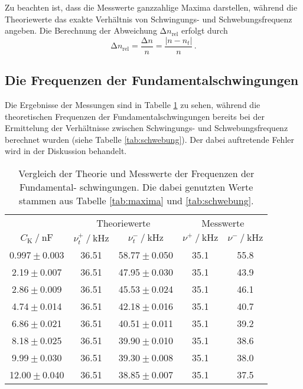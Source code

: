 Zu beachten ist, dass die Messwerte
ganzzahlige Maxima darstellen, während die Theoriewerte das exakte Verhältnis von
Schwingungs- und Schwebungsfrequenz angeben. Die Berechnung der Abweichung $\increment n_{\text{rel}}$ erfolgt durch
\begin{equation}
    \increment n_{\text{rel}} = \frac{\increment n}{n}=\frac{\left|n-n_{t}\right|}{n} \, .
\end{equation}


\subsection{Die Frequenzen der Fundamentalschwingungen}

Die Ergebnisse der Messungen sind in Tabelle \ref{tab:vergleich} zu sehen, während die
theoretischen Frequenzen der Fundamentalschwingungen bereits bei der
Ermittelung der Verhältnisse zwischen Schwingungs- und Schwebungsfrequenz berechnet
wurden (siehe Tabelle \ref{tab:schwebung}). Der dabei auftretende Fehler wird in der Diskussion behandelt.
\begin{table}
    \centering
    \caption{   Vergleich der Theorie und Messwerte der Frequenzen der Fundamental-
                schwingungen. Die dabei genutzten Werte stammen aus Tabelle
                \ref{tab:maxima} und \ref{tab:schwebung}.}
    \label{tab:vergleich}
    \begin{tabular}{c c c c c}
    \toprule
    & \multicolumn{2}{c}{Theoriewerte} & \multicolumn{2}{c}{Messwerte} \\
    \cmidrule(lr){2-3}\cmidrule(lr){4-5}
    {${C_\text{K}} \mathbin{/} \unit{\nano\farad}$} &
    {$\nu^+_{t} \mathbin{/} \unit{\kilo\hertz}$} & {$\nu^-_{t} \mathbin{/} \unit{\kilo\hertz}$} &
    {$\nu^+ \mathbin{/} \unit{\kilo\hertz}$} & {$\nu^- \mathbin{/} \unit{\kilo\hertz}$} \\
    \midrule
    0.997${}\pm{}$0.003 &    36.51 & 58.77${}\pm{}$0.050 &    35.1 &   55.8 \\
     2.19${}\pm{}$0.007 &    36.51 & 47.95${}\pm{}$0.030 &    35.1 &   43.9 \\
     2.86${}\pm{}$0.009 &    36.51 & 45.53${}\pm{}$0.024 &    35.1 &   46.1 \\
     4.74${}\pm{}$0.014 &    36.51 & 42.18${}\pm{}$0.016 &    35.1 &   40.7 \\
     6.86${}\pm{}$0.021 &    36.51 & 40.51${}\pm{}$0.011 &    35.1 &   39.2 \\
     8.18${}\pm{}$0.025 &    36.51 & 39.90${}\pm{}$0.010 &    35.1 &   38.6 \\
     9.99${}\pm{}$0.030 &    36.51 & 39.30${}\pm{}$0.008 &    35.1 &   38.0 \\
    12.00${}\pm{}$0.040 &    36.51 & 38.85${}\pm{}$0.007 &    35.1 &   37.5 \\
    \bottomrule
    \end{tabular}
\end{table}

